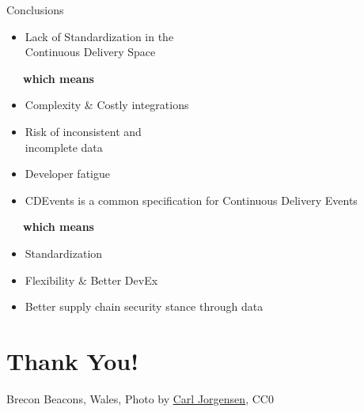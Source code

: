\documentclass[aspectratio=169,11pt,hyperref={colorlinks=true}]{beamer}
\begin{document}
\begin{2columnsframe}{Conclusions}%
  {%
  \begin{itemize}
    \item Lack of Standardization in the\\
    Continuous Delivery Space
  \end{itemize}
  \vspace{0.22\textheight}
  ~~~\textbf{which means}
  \vspace{0.05\textheight}
  \begin{itemize}
    \item Complexity \& Costly integrations
    \item Risk of inconsistent and\\
          incomplete data
    \item Developer fatigue
  \end{itemize}
  }{%
  \begin{itemize}
    \item CDEvents is a common specification for Continuous Delivery Events
  \end{itemize}
  \vspace{0.22\textheight}
  ~~~\textbf{which means}
  \vspace{0.05\textheight}
  \begin{itemize}
    \item Standardization
    \item Flexibility \& Better DevEx
    \item Better supply chain security stance through data
  \end{itemize}
  }
\end{2columnsframe}

\section[Thank You]{Thank You!}

\begin{sectionwithpiclargecentral}{Brecon Beacons, Wales, Photo by \href{https://unsplash.com/@scamartist}{\underline{Carl Jorgensen}}, CC0}
\end{sectionwithpiclargecentral}
\end{document}
